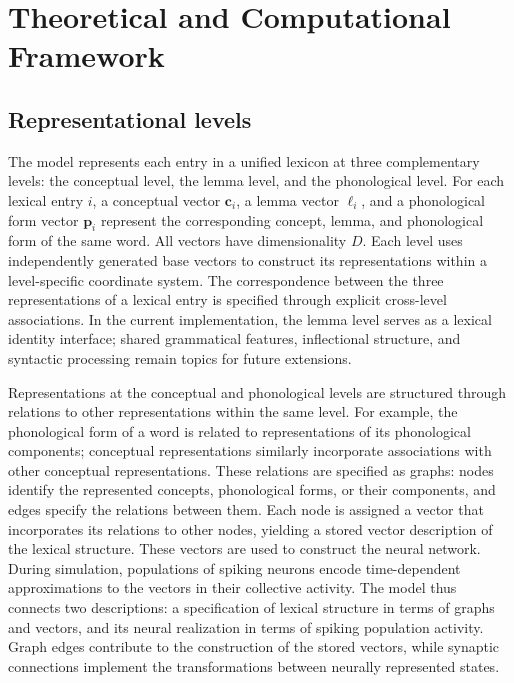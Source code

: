 \section{Theoretical and Computational Framework}
\subsection{Representational levels}
The model represents each entry in a unified lexicon at three complementary levels: the conceptual level, the lemma level, and the phonological level. For each lexical entry $i$, a conceptual vector $\mathbf c_i$, a lemma vector $\boldsymbol\ell_i$, and a phonological form vector $\mathbf p_i$ represent the corresponding concept, lemma, and phonological form of the same word. All vectors have dimensionality $D$. Each level uses independently generated base vectors to construct its representations within a level-specific coordinate system. The correspondence between the three representations of a lexical entry is specified through explicit cross-level associations. In the current implementation, the lemma level serves as a lexical identity interface; shared grammatical features, inflectional structure, and syntactic processing remain topics for future extensions.

Representations at the conceptual and phonological levels are structured through relations to other representations within the same level. For example, the phonological form of a word is related to representations of its phonological components; conceptual representations similarly incorporate associations with other conceptual representations. These relations are specified as graphs: nodes identify the represented concepts, phonological forms, or their components, and edges specify the relations between them. Each node is assigned a vector that incorporates its relations to other nodes, yielding a stored vector description of the lexical structure. These vectors are used to construct the neural network. During simulation, populations of spiking neurons encode time-dependent approximations to the vectors in their collective activity. The model thus connects two descriptions: a specification of lexical structure in terms of graphs and vectors, and its neural realization in terms of spiking population activity. Graph edges contribute to the construction of the stored vectors, while synaptic connections implement the transformations between neurally represented states.

